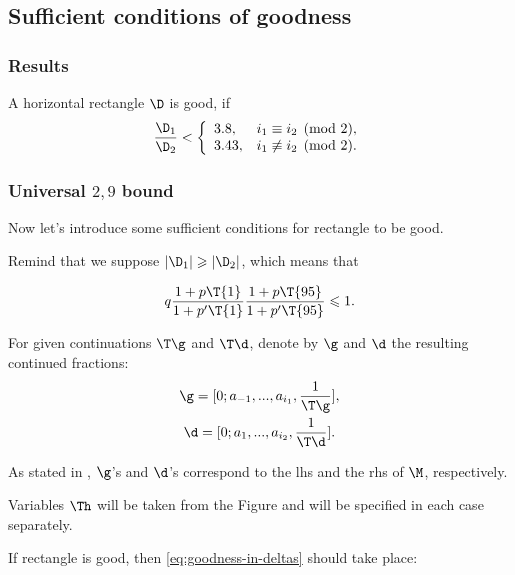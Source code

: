 \subsection{Sufficient conditions of goodness}

\subsubsection{Results}

A horizontal rectangle $\D$ is good, if
\begin{equation}\label{goodness_condition}
	\dfrac{\D_1}{\D_2} <
	\left\{\begin{array}{ll}
		3.8, & i_1 \equiv i_2 \pmod 2,\\
		3.43, & i_1 \not\equiv i_2 \pmod 2.
	\end{array}\right.
\end{equation}

\subsubsection{Universal $2,9$ bound}

Now let's introduce some sufficient conditions for rectangle to be good.

Remind that we suppose $|\D_1| \geqslant |\D_2|$, which means that

\begin{equation*}
	q
	\dfrac{1 + p \T{1}}{1 + p' \T{1}}
	\dfrac{1 + p \T{95}}{1 + p' \T{95}} \leqslant 1.
\end{equation*}

\begin{designation}
	For given continuations $\T\g$ and $\T\d$, denote by $\g$ and $\d$ the resulting continued fractions:
	\begin{gather*}
		\g = [0; a_{-1}, ..., a_{i_1}, \frac{1}{\T\g}], \\
		\d = [0; a_{1}, ..., a_{i_2}, \frac{1}{\T\d}].
	\end{gather*}

	As stated in ,
	$\g$'s and $\d$'s correspond to the lhs and the rhs of $\M$, respectively.
	
	Variables $\Th$ will be taken from the Figure 
	and will be specified in each case separately.
\end{designation}

If rectangle is good, then \ref{eq:goodness-in-deltas} should take place:

